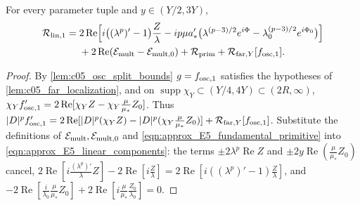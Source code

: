 \begin{lemma}
  \label{lem:c05_fundamental_identity}
  For every parameter tuple and $y\in(Y/2,3Y)$,
  \begin{equation}\label{eqn:approx_E5_fundamental_error_identity}
  \begin{aligned}
    \mathcal{R}_{\textup{lin},1}={}&2\operatorname{Re}\Bigl[i\bigl((\lambda^p)'-1\bigr)\frac{Z}{\lambda}
      -ip\mu a_*'\bigl(\lambda^{(p-3)/2}e^{i\Phi}-\lambda_0^{(p-3)/2}e^{i\Phi_0}\bigr)\Bigr]\\
    &+2\operatorname{Re}(\mathcal{E}_{\textup{mult}}-\mathcal{E}_{\textup{mult},0})+\mathcal{R}_{\textup{prim}}+\mathcal{R}_{\textup{far},Y}[f_{\textup{osc},1}].
  \end{aligned}
  \end{equation}
\end{lemma}
\begin{proof}
  By \cref{lem:c05_osc_split_bounds} $g=f_{\textup{osc},1}$ satisfies the hypotheses of \cref{lem:c05_far_localization}, and on
  $\operatorname{supp}\chi_Y\subset(Y/4,4Y)\subset(2R,\infty)$, $\chi_Yf'_{\textup{osc},1}=2\operatorname{Re}[\chi_YZ-\chi_Y\frac{\mu}{\mu_*}Z_0]$. Thus
  $|D|^pf'_{\textup{osc},1}=2\operatorname{Re}[|D|^p(\chi_YZ)-|D|^p(\chi_Y\frac{\mu}{\mu_*}Z_0)]+\mathcal{R}_{\textup{far},Y}[f_{\textup{osc},1}]$.
  Substitute the definitions of $\mathcal{E}_{\textup{mult}},\mathcal{E}_{\textup{mult},0}$ and \eqref{eqn:approx_E5_fundamental_primitive} into
  \eqref{eqn:approx_E5_linear_components}: the terms $\pm2\lambda^p\operatorname{Re}Z$ and $\pm2y\operatorname{Re}(\frac{\mu}{\mu_*}Z_0)$ cancel,
  $2\operatorname{Re}[i\frac{(\lambda^p)'}{\lambda}Z]-2\operatorname{Re}[i\frac{Z}{\lambda}]=2\operatorname{Re}[i((\lambda^p)'-1)\frac Z\lambda]$, and
  $-2\operatorname{Re}[\frac{i}{\lambda_0}\frac{\mu}{\mu_*}Z_0]+2\operatorname{Re}[i\frac{\mu}{\mu_*}\frac{Z_0}{\lambda_0}]=0$.
\end{proof}

